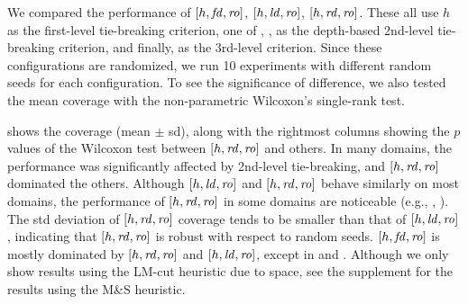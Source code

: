 We compared the performance of
$[h,\mbox{\textit{fd}},\mbox{\textit{ro}}]$, $[h,\mbox{\textit{ld}},\mbox{\textit{ro}}]$, $[h,\mbox{\textit{rd}},\mbox{\textit{ro}}]$. These all use 
$h$ as the first-level tie-breaking criterion, one of \fd, \ld, \rd as
the depth-based 2nd-level tie-breaking criterion, and finally,
\ro as the 3rd-level criterion.
Since these configurations are randomized, we run 10
experiments with different random seeds for each configuration.
To see the significance of difference,
we also tested the mean coverage with the non-parametric Wilcoxon's single-rank test.

 shows the coverage (mean $\pm$ sd),
along with the rightmost columns showing the $p$ values of the
Wilcoxon test between $[h,\mbox{\textit{rd}},\mbox{\textit{ro}}]$ and others.
In many domains,
the performance was significantly affected by 2nd-level tie-breaking, and
$[h,\mbox{\textit{rd}},\mbox{\textit{ro}}]$ dominated the others. 
Although $[h, \mbox{\textit{ld}}, \mbox{\textit{ro}}]$ and $[h,\mbox{\textit{rd}},\mbox{\textit{ro}}]$ behave similarly on most domains, 
the performance of $[h,\mbox{\textit{rd}},\mbox{\textit{ro}}]$ in some
domains are noticeable (e.g., , ). 
The std deviation of $[h,\mbox{\textit{rd}},\mbox{\textit{ro}}]$ coverage tends to be smaller
than that of $[h,\mbox{\textit{ld}},\mbox{\textit{ro}}]$, indicating that $[h,\mbox{\textit{rd}},\mbox{\textit{ro}}]$ is robust with respect to random seeds.
$[h,\mbox{\textit{fd}},\mbox{\textit{ro}}]$ is mostly dominated by $[h,\mbox{\textit{rd}},\mbox{\textit{ro}}]$ and $[h,\mbox{\textit{ld}},\mbox{\textit{ro}}]$,
except in  and .
Although we only show results using the LM-cut heuristic due to space, see the supplement for the results using the M\&S heuristic.

